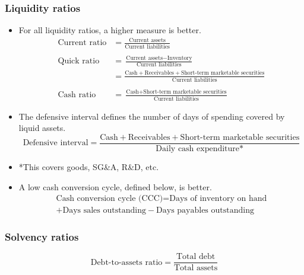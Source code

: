 \documentclass[../notes_compiled.tex]{subfiles}
\begin{document}
\subsubsection{Liquidity ratios}

\begin{itemize}
\item For all liquidity ratios, a higher measure is better.
\begin{align*}
\text{Current ratio} &= \frac{\text{Current assets}}{\text{Current liabilities}} \\ \\
\text{Quick ratio} &= \frac{\text{Current assets}-\text{Inventory}}{\text{Current liabilities}} \\
&= \frac{\text{Cash} + \text{Receivables} + \text{Short-term marketable securities}}{\text{Current liabilities}} \\ \\
\text{Cash ratio} &= \frac{\text{Cash} + \text{Short-term marketable securities}}{\text{Current liabilities}}
\end{align*}

\item The defensive interval defines the number of days of spending covered by liquid assets.
\begin{equation*}
\text{Defensive interval} = \frac{\text{Cash} + \text{Receivables} + \text{Short-term marketable securities}}{\text{Daily cash expenditure*}}
\end{equation*}
\item[] *This covers goods, SG\&A, R\&D, etc. 
\item A low cash conversion cycle, defined below, is better.
\begin{multline*}
\text{Cash conversion cycle (CCC)} = \text{Days of inventory on hand} \\ + \text{Days sales outstanding} - \text{Days payables outstanding}
\end{multline*}

\end{itemize}




\subsubsection{Solvency ratios}
\begin{equation*}
\text{Debt-to-assets ratio} = \frac{\text{Total debt}}{\text{Total assets}}
\end{equation*}
\end{document}
